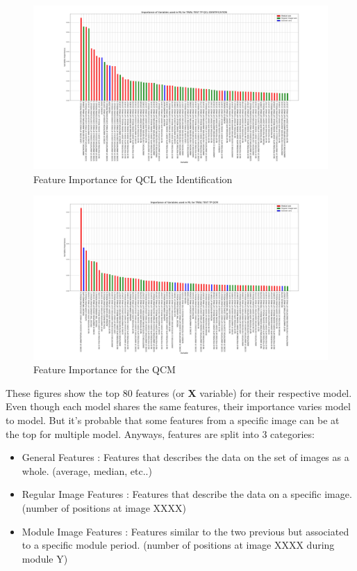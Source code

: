 \documentclass[a4paper,11pt]{report}
\numberwithin{figure}{section} %
\begin{document}
      \begin{figure}[H]
      \centering
      \includegraphics[width=.95\linewidth]{var_importance_TRIAL_TEST_TP_QCL_IDENTIFICATION_2018-04-29_14_28_02.png}
      \caption{Feature Importance for QCL the Identification}
      \label{fig:var_white2}
      \end{figure}
      
      \begin{figure}[H]
      \centering
      \includegraphics[width=.95\linewidth]{var_importance_TRIAL_TEST_TP_QCM_2018-04-29_14_34_16.png}
      \caption{Feature Importance for the QCM}
      \label{fig:var_white3}
      \end{figure}
    
    These figures show the top 80 features (or \textbf{X} variable) for their respective model.
    Even though each model shares the same features, their importance varies model to model.
    But it's probable that some features from a specific image can be at the top for multiple model.
    Anyways, features are split into 3 categories:
    \begin{itemize}
    \item[\textbullet] General Features : Features that describes the data on the set of images as a whole. (average, median, etc..)
    \item[\textbullet] Regular Image Features : Features that describe the data on a specific image. (number of positions at image XXXX)
    \item[\textbullet] Module Image Features : Features similar to the two previous but associated to a specific module period. (number of positions at image XXXX during module Y)
    \end{itemize}
    
\end{document}
